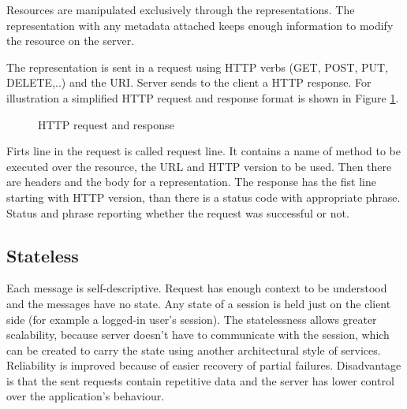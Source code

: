 Resources are manipulated exclusively through the representations. The representation with any metadata attached keeps enough information to modify the resource on the server.


The representation is sent in a request using HTTP verbs (GET, POST, PUT, DELETE,..) and the URI. Server sends to the client a HTTP response. For illustration a simplified HTTP request and response format is shown in Figure \ref{fig:http}.

\begin{figure}[htp] 
\caption{HTTP request and response}
\label{fig:http}
\end{figure} 

Firts line in the request is called request line. It contains a name of method to be executed over the resource, the URL and HTTP version to be used. Then there are headers and the body for a representation. The response has the fist line starting with HTTP version, than there is a status code with appropriate phrase. Status and phrase reporting whether the request was successful or not.

\subsection{Stateless}
  
Each message is self-descriptive. Request has enough context to be understood and the messages have no state. Any state of a \gls{session} is held just on the client side (for example a logged-in user's session).
The statelessness allows greater scalability, because server doesn't have to communicate with the session, which can be created to carry the state using another architectural style of services. Reliability is improved because of easier recovery of partial failures. Disadvantage is that the sent requests contain repetitive data and the server has lower control over the application's behaviour.

